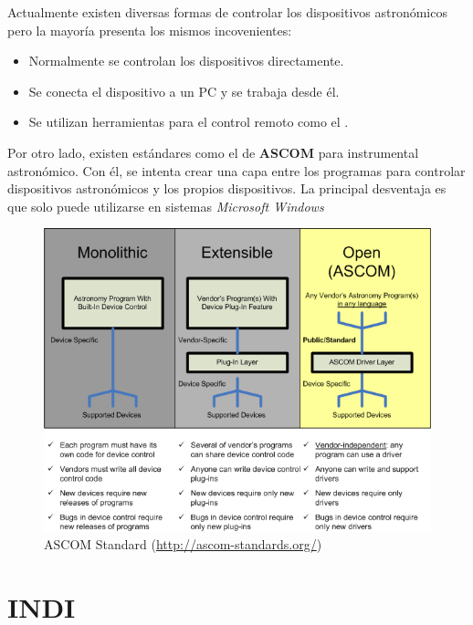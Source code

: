 Actualmente existen diversas formas de controlar los dispositivos astronómicos pero la mayoría presenta los mismos incovenientes:

\begin{itemize}
  \item Normalmente se controlan los dispositivos directamente.
  \item Se conecta el dispositivo a un PC y se trabaja desde él.
  \item Se utilizan herramientas para el control remoto como el .
\end{itemize}

\bigskip

Por otro lado, existen estándares como el de \textbf{ASCOM} para instrumental astronómico. Con él, se intenta crear una capa entre los programas para controlar dispositivos astronómicos y los propios dispositivos. La principal desventaja es que solo puede utilizarse en sistemas \textit{Microsoft Windows}

\bigskip
\begin{figure}[!ht]
  \begin{center}
    \includegraphics[scale=0.5]{../images/ascom.png}
    \caption{ASCOM Standard (\url{http://ascom-standards.org/})}
    \label{fig:ascom}
  \end{center}
\end{figure}


\newpage
\section{INDI}

